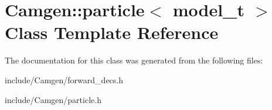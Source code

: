 \hypertarget{a00394}{\section{Camgen\-:\-:particle$<$ model\-\_\-t $>$ Class Template Reference}
\label{a00394}
}


The documentation for this class was generated from the following files\-:\begin{DoxyCompactItemize}
\item 
include/\-Camgen/forward\-\_\-decs.\-h\item 
include/\-Camgen/particle.\-h\end{DoxyCompactItemize}
